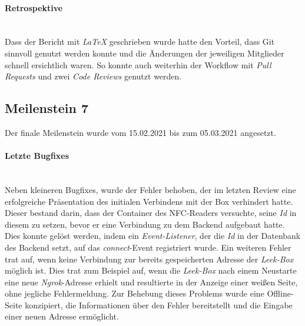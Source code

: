 \documentclass[10pt, a4paper]{article}
\begin{document}
\begin{onehalfspace}
\paragraph*{Retrospektive} $~$ \\
Dass der Bericht mit \textit{LaTeX} geschrieben wurde hatte den Vorteil, dass Git sinnvoll genutzt werden konnte und die Änderungen der jeweiligen Mitglieder schnell ersichtlich waren.
So konnte auch weiterhin der Workflow mit \textit{Pull Requests} und zwei \textit{Code Reviews} genutzt werden.

\subsection{Meilenstein 7}
Der finale Meilenstein wurde vom 15.02.2021 bis zum 05.03.2021 angesetzt.

\paragraph*{Letzte Bugfixes} $~$ \\
Neben kleineren Bugfixes, wurde der Fehler behoben, der im letzten Review eine erfolgreiche Präsentation des initialen Verbindens mit der Box verhindert hatte.
Dieser bestand darin, dass der Container des NFC-Readers versuchte, seine \textit{Id} in diesem zu setzen, bevor er eine Verbindung zu dem Backend aufgebaut hatte.
Dies konnte gelöst werden, indem ein \textit{Event-Listener}, der die \textit{Id} in der Datenbank des Backend setzt, auf das \textit{connect}-Event registriert wurde.
Ein weiteren Fehler trat auf, wenn keine Verbindung zur bereits gespeicherten Adresse der \textit{Leek-Box} möglich ist.
Dies trat zum Beispiel auf, wenn die \textit{Leek-Box} nach einem Neustarte eine neue \textit{Ngrok}-Adresse erhielt und resultierte in der Anzeige einer weißen Seite, ohne jegliche Fehlermeldung.
Zur Behebung dieses Problems wurde eine Offline-Seite konzipiert, die Informationen über den Fehler bereitstellt und die Eingabe einer neuen Adresse ermöglicht.



\end{onehalfspace}
\end{document}
